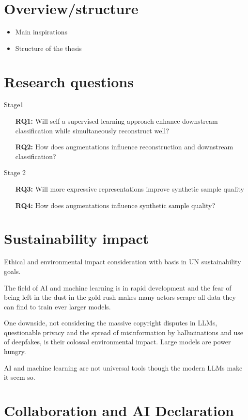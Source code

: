 \documentclass[../../thesis.tex]{subfiles}
\begin{document}
\section{Overview/structure}
\begin{itemize}
	\item Main inspirations \cite{TimeVQVAE} 
	\item Structure of the thesis

\end{itemize}

\section{Research questions}
Stage1
\begin{itemize}
	\item[\textbf{RQ1:}] Will self a supervised learning approach enhance downstream classification while simultaneously reconstruct well?
	\item[\textbf{RQ2:}] How does augmentations influence reconstruction and downstream classification? 
\end{itemize}
Stage 2
\begin{itemize}
	\item[\textbf{RQ3:}] Will more expressive representations improve synthetic sample quality
	\item[\textbf{RQ4:}] How does augmentations influence synthetic sample quality?
\end{itemize}


\section{Sustainability impact}
Ethical and environmental impact consideration with basis in UN sustainability goals.

The field of AI and machine learning is in rapid development and the fear of being left in the dust in the gold rush makes many actors scrape all data they can find to train ever larger models. 

One downside, not considering the massive copyright disputes in LLMs, questionable privacy and the spread of misinformation by hallucinations and use of deepfakes, is their colossal environmental impact. Large models are power hungry. 


AI and machine learning are not universal tools though the modern LLMs make it seem so.



\section{Collaboration and AI Declaration }
\end{document}
